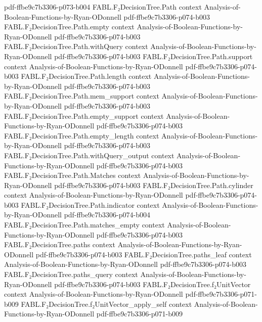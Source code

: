 \begin{theorem}
  {pdf-ffbe9c7b3306-p073-b004}
\proofstep
  {FABL.F₂DecisionTree.Path}
  {context}
  {Analysis-of-Boolean-Functions-by-Ryan-ODonnell}
  {pdf-ffbe9c7b3306-p074-b003}
\proofstep
  {FABL.F₂DecisionTree.Path.empty}
  {context}
  {Analysis-of-Boolean-Functions-by-Ryan-ODonnell}
  {pdf-ffbe9c7b3306-p074-b003}
\proofstep
  {FABL.F₂DecisionTree.Path.withQuery}
  {context}
  {Analysis-of-Boolean-Functions-by-Ryan-ODonnell}
  {pdf-ffbe9c7b3306-p074-b003}
\proofstep
  {FABL.F₂DecisionTree.Path.support}
  {context}
  {Analysis-of-Boolean-Functions-by-Ryan-ODonnell}
  {pdf-ffbe9c7b3306-p074-b003}
\proofstep
  {FABL.F₂DecisionTree.Path.length}
  {context}
  {Analysis-of-Boolean-Functions-by-Ryan-ODonnell}
  {pdf-ffbe9c7b3306-p074-b003}
\proofstep
  {FABL.F₂DecisionTree.Path.mem_support}
  {context}
  {Analysis-of-Boolean-Functions-by-Ryan-ODonnell}
  {pdf-ffbe9c7b3306-p074-b003}
\proofstep
  {FABL.F₂DecisionTree.Path.empty_support}
  {context}
  {Analysis-of-Boolean-Functions-by-Ryan-ODonnell}
  {pdf-ffbe9c7b3306-p074-b003}
\proofstep
  {FABL.F₂DecisionTree.Path.empty_length}
  {context}
  {Analysis-of-Boolean-Functions-by-Ryan-ODonnell}
  {pdf-ffbe9c7b3306-p074-b003}
\proofstep
  {FABL.F₂DecisionTree.Path.withQuery_output}
  {context}
  {Analysis-of-Boolean-Functions-by-Ryan-ODonnell}
  {pdf-ffbe9c7b3306-p074-b003}
\proofstep
  {FABL.F₂DecisionTree.Path.Matches}
  {context}
  {Analysis-of-Boolean-Functions-by-Ryan-ODonnell}
  {pdf-ffbe9c7b3306-p074-b003}
\proofstep
  {FABL.F₂DecisionTree.Path.cylinder}
  {context}
  {Analysis-of-Boolean-Functions-by-Ryan-ODonnell}
  {pdf-ffbe9c7b3306-p074-b003}
\proofstep
  {FABL.F₂DecisionTree.Path.indicator}
  {context}
  {Analysis-of-Boolean-Functions-by-Ryan-ODonnell}
  {pdf-ffbe9c7b3306-p074-b004}
\proofstep
  {FABL.F₂DecisionTree.Path.matches_empty}
  {context}
  {Analysis-of-Boolean-Functions-by-Ryan-ODonnell}
  {pdf-ffbe9c7b3306-p074-b003}
\proofstep
  {FABL.F₂DecisionTree.paths}
  {context}
  {Analysis-of-Boolean-Functions-by-Ryan-ODonnell}
  {pdf-ffbe9c7b3306-p074-b003}
\proofstep
  {FABL.F₂DecisionTree.paths_leaf}
  {context}
  {Analysis-of-Boolean-Functions-by-Ryan-ODonnell}
  {pdf-ffbe9c7b3306-p074-b003}
\proofstep
  {FABL.F₂DecisionTree.paths_query}
  {context}
  {Analysis-of-Boolean-Functions-by-Ryan-ODonnell}
  {pdf-ffbe9c7b3306-p074-b003}
\proofstep
  {FABL.F₂DecisionTree.f₂UnitVector}
  {context}
  {Analysis-of-Boolean-Functions-by-Ryan-ODonnell}
  {pdf-ffbe9c7b3306-p071-b009}
\proofstep
  {FABL.F₂DecisionTree.f₂UnitVector_apply_self}
  {context}
  {Analysis-of-Boolean-Functions-by-Ryan-ODonnell}
  {pdf-ffbe9c7b3306-p071-b009}

\end{theorem}
